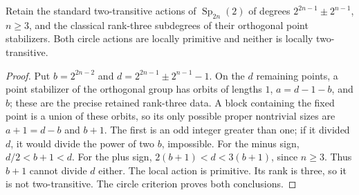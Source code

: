 \begin{proposition}\label{orthogonalcircles}
Retain the standard two-transitive actions of
$\operatorname{Sp}_{2n}(2)$ of degrees
$2^{2n-1}\pm2^{n-1}$, $n\geq3$, and the classical rank-three subdegrees
of their orthogonal point stabilizers. Both circle actions are locally
primitive and neither is locally two-transitive.
\end{proposition}
\begin{proof}
Put $b=2^{2n-2}$ and $d=2^{2n-1}\pm2^{n-1}-1$.
On the $d$ remaining points, a point stabilizer of the orthogonal group
has orbits of lengths $1$, $a=d-1-b$, and $b$; these are the precise
retained rank-three data. A block containing the fixed point is a union
of these orbits, so its only possible proper nontrivial sizes are
$a+1=d-b$ and $b+1$. The first is an odd integer greater than one; if it
divided $d$, it would divide the power of two $b$, impossible. For the
minus sign, $d/2<b+1<d$. For the plus sign,
$2(b+1)<d<3(b+1)$, since $n\geq3$. Thus $b+1$ cannot divide $d$ either.
The local action is primitive. Its rank is three, so it is not
two-transitive. The circle criterion proves both conclusions.
\end{proof}
